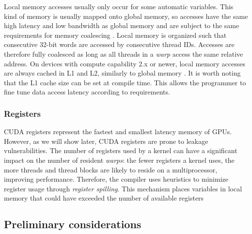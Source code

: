 \documentclass[11pt,onecolumn,letterpaper]{IEEEtran}
\begin{document}
Local memory accesses usually only occur for some automatic variables.
This kind of memory is usually mapped onto global memory, so accesses have the same high latency
and low bandwidth as global memory and are subject to the same requirements for memory coalescing \cite{coalescing}.
Local memory is organized such that consecutive 32-bit words are accessed by consecutive thread IDs.
Accesses are therefore fully coalesced as long as all threads in a \textit{warp} access the same relative address.
On devices with compute capability  2.x or newer, local memory accesses
are always cached in L1 and L2, similarly to global memory \cite{cudadevguide}.
It is worth noting that the L1 cache size can be set at compile time.
This allows the programmer to fine tune data access latency according to requirements.

\subsubsection{Registers}

CUDA registers represent the fastest and smallest latency memory of GPUs. 
However, as we will show later, CUDA registers are prone to leakage vulnerabilities. 
The number of registers used by a kernel can have a significant impact on the 
number of resident \textit{warps}: the fewer registers a kernel uses, the more 
threads and thread blocks are likely to reside on a multiprocessor, improving performance.
Therefore, the compiler uses heuristics to minimize register usage through \emph{register spilling}.
This mechanism places variables in local memory that could have exceeded the number of available registers

\subsection{Preliminary considerations}
\end{document}
